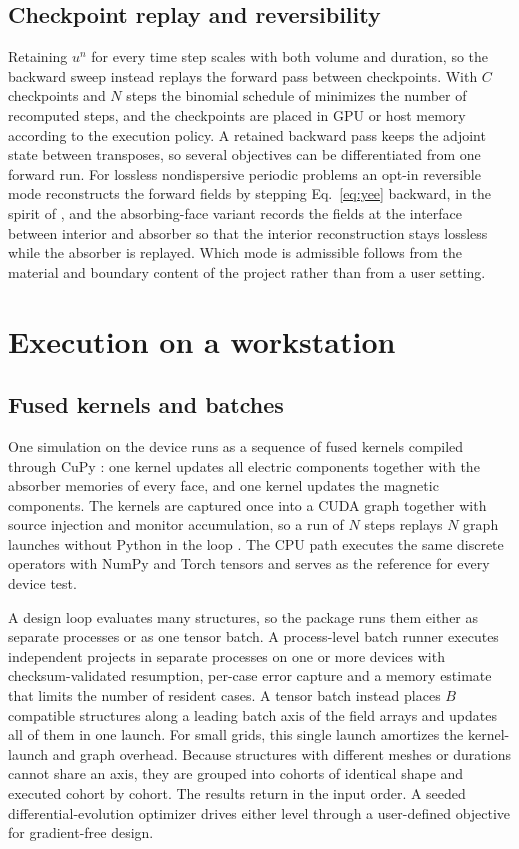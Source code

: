 \documentclass[11pt,a4paper]{article}
\begin{document}
\subsection{Checkpoint replay and reversibility}

Retaining $u^{n}$ for every time step scales with both volume and duration, so the backward sweep instead replays the forward pass between checkpoints. With $C$ checkpoints and $N$ steps the binomial schedule of \citet{griewank2000} minimizes the number of recomputed steps, and the checkpoints are placed in GPU or host memory according to the execution policy. A retained backward pass keeps the adjoint state between transposes, so several objectives can be differentiated from one forward run. For lossless nondispersive periodic problems an opt-in reversible mode reconstructs the forward fields by stepping Eq.~\eqref{eq:yee} backward, in the spirit of \citet{mahlau2024}, and the absorbing-face variant records the fields at the interface between interior and absorber so that the interior reconstruction stays lossless while the absorber is replayed. Which mode is admissible follows from the material and boundary content of the project rather than from a user setting.

\section{Execution on a workstation}
\label{sec:execution}

\subsection{Fused kernels and batches}

One simulation on the device runs as a sequence of fused kernels compiled through CuPy \citep{okuta2017}: one kernel updates all electric components together with the absorber memories of every face, and one kernel updates the magnetic components. The kernels are captured once into a CUDA graph together with source injection and monitor accumulation, so a run of $N$ steps replays $N$ graph launches without Python in the loop \citep{paszke2019}. The CPU path executes the same discrete operators with NumPy and Torch tensors and serves as the reference for every device test.

A design loop evaluates many structures, so the package runs them either as separate processes or as one tensor batch. A process-level batch runner executes independent projects in separate processes on one or more devices with checksum-validated resumption, per-case error capture and a memory estimate that limits the number of resident cases. A tensor batch instead places $B$ compatible structures along a leading batch axis of the field arrays and updates all of them in one launch. For small grids, this single launch amortizes the kernel-launch and graph overhead. Because structures with different meshes or durations cannot share an axis, they are grouped into cohorts of identical shape and executed cohort by cohort. The results return in the input order. A seeded differential-evolution optimizer \citep{storn1997} drives either level through a user-defined objective for gradient-free design.
\end{document}
